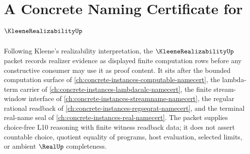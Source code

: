 \chapter{A Concrete Naming Certificate for $\KleeneRealizabilityUp$}
\label{ch:concrete-instances-kleene-realizability-namecert}

Following Kleene's realizability interpretation, the $\KleeneRealizabilityUp$ packet records realizer evidence as displayed finite computation rows before any constructive consumer may use it as proof content. It sits after the bounded computation surface of \autoref{ch:concrete-instances-computable-namecert}, the lambda-term carrier of \autoref{ch:concrete-instances-lambdacalc-namecert}, the finite stream-window interface of \autoref{ch:concrete-instances-streamname-namecert}, the regular rational readback of \autoref{ch:concrete-instances-regseqrat-namecert}, and the terminal real-name seal of \autoref{ch:concrete-instances-real-namecert}. The packet supplies choice-free L10 reasoning with finite witness readback data; it does not assert countable choice, quotient equality of programs, host evaluation, selected limits, or ambient $\RealUp$ completeness.

